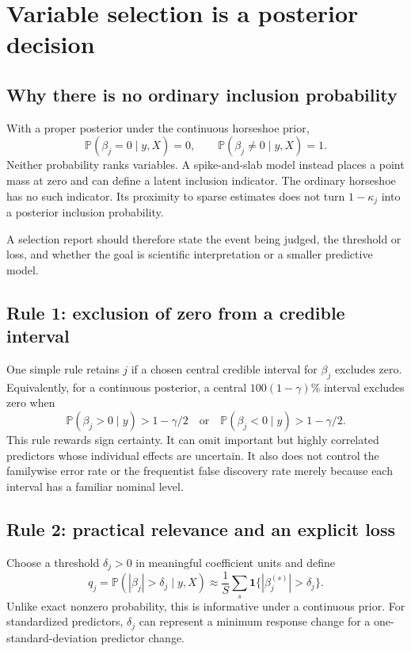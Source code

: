 \documentclass[11pt,letterpaper]{article}
\numberwithin{equation}{section}
\newcommand{\Prob}{\mathbb{P}}
\newcommand{\ind}{\mathbf{1}}
\newcommand{\given}{\mid}
\begin{document}
\section{Variable selection is a posterior decision}\label{sec:selection}

\subsection{Why there is no ordinary inclusion probability}

With a proper posterior under the continuous horseshoe prior,
\begin{equation}
 \Prob(\beta_j=0\given y,X)=0,\qquad
 \Prob(\beta_j\ne0\given y,X)=1.
\end{equation}
Neither probability ranks variables. A spike-and-slab model instead places
a point mass at zero and can define a latent inclusion indicator. The
ordinary horseshoe has no such indicator. Its proximity to sparse estimates
does not turn \(1-\kappa_j\) into a posterior inclusion probability.

A selection report should therefore state the event being judged, the
threshold or loss, and whether the goal is scientific interpretation or a
smaller predictive model.

\subsection{Rule 1: exclusion of zero from a credible interval}

One simple rule retains \(j\) if a chosen central credible interval for
\(\beta_j\) excludes zero. Equivalently, for a continuous posterior, a
central \(100(1-\gamma)\%\) interval excludes zero when
\[
 \Prob(\beta_j>0\given y)>1-\gamma/2
 \quad\text{or}\quad
 \Prob(\beta_j<0\given y)>1-\gamma/2.
\]
This rule rewards sign certainty. It can omit important but highly correlated
predictors whose individual effects are uncertain. It also does not control
the familywise error rate or the frequentist false discovery rate merely
because each interval has a familiar nominal level.

\subsection{Rule 2: practical relevance and an explicit loss}

Choose a threshold \(\delta_j>0\) in meaningful coefficient units and define
\begin{equation}
 q_j=\Prob(|\beta_j|>\delta_j\given y,X)
 \approx\frac1S\sum_s\ind\{|\beta_j^{(s)}|>\delta_j\}.
\end{equation}
Unlike exact nonzero probability, this is informative under a continuous
prior. For standardized predictors, \(\delta_j\) can represent a minimum
response change for a one-standard-deviation predictor change.
\end{document}
